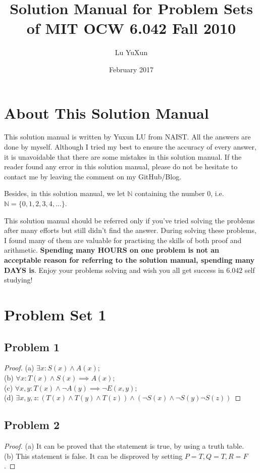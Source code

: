 \documentclass{article}
\title{Solution Manual for Problem Sets of MIT OCW 6.042 Fall 2010}
\author{Lu YuXun}
\date{February 2017}
\begin{document}
\maketitle
\section{About This Solution Manual}
This solution manual is written by Yuxun LU from NAIST. All the answers are done by myself. Although I tried my best to ensure the accuracy of every answer, it is unavoidable that there are some mistakes in this solution manual. If the reader found any error in this solution manual, please do not be hesitate to contact me by leaving the comment on my GitHub/Blog.

Besides, in this solution manual, we let $\mathbb{N}$ containing the number $0$, i.e. $\mathbb{N} = \{0, 1, 2, 3, 4, ...\}$. 

This solution manual should be referred only if you've tried solving the problems after many efforts but still didn't find the answer. During solving these problems, I found many of them are valuable for practising the skills of both proof and  arithmetic. \textbf{Spending many HOURS on one problem is not an acceptable reason for referring to the solution manual, spending many DAYS is}. Enjoy your problems solving and wish you all get success in 6.042 self studying!
\section{Problem Set 1}
\subsection{Problem 1}
\begin{proof}
(a) $\exists x: S(x) \wedge A(x)$;
\\(b) $\forall x: T(x) \wedge S(x) \implies A(x)$;
\\(c) $\forall x,y: T(x) \wedge \neg A(y) \implies \neg E(x,y)$;
\\(d) $\exists x,y,z: ( T(x) \wedge T(y) \wedge T(z) ) \wedge ( \neg S(x) \wedge \neg S(y) \neg S(z) )$
\end{proof}
\subsection{Problem 2}
\begin{proof}
(a) It can be proved that the statement is true, by using a truth table.\\
(b) This statement is false. It can be disproved by setting $P=T, Q=T, R=F$.
\end{proof}
\end{document}
